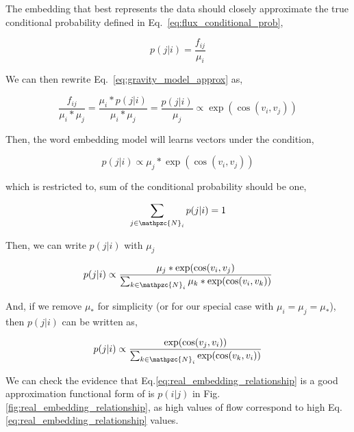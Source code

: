 \documentclass[12pt]{article} %
\begin{document}
The embedding that best represents the data should closely approximate the true conditional probability defined in
Eq.~\ref{eq:flux_conditional_prob},

\begin{equation}
    \label{eq:flux_conditional_prob}
    p(j|i) = \frac{f_{ij}}{\mu_i} 
\end{equation}

We can then rewrite Eq.~\ref{eq:gravity_model_approx} as, 

\begin{equation}
    \label{eq:gravity_relationship}
    \frac{f_{ij}}{\mu_i * \mu_j} = \frac{\mu_i * p(j|i)}{\mu_i * \mu_j} =  \frac{p(j|i)}{\mu_j} \propto \exp(\cos(v_i,v_j))
\end{equation}

Then, the word embedding model will learns vectors under the condition,

\begin{equation}
    \label{eq:conditional probability}
      p(j|i) \propto {\mu_j}* \exp(\cos(v_i,v_j))
\end{equation}

which is restricted to, sum of the conditional probability should be one,

\begin{equation}
    \label{eq:sum of the conditional probabiitliy}
    \sum_{j\in\mathpzc{N}_i} p(j|i) = 1
\end{equation}

Then, we can write $p(j|i)$ with $\mu_{j}$

\begin{equation}
    p(j|i) \propto \frac{{\mu_j}* \exp(\cos(v_i,v_j)}{\sum_{k\in\mathpzc{N}_i} {\mu_k}* \exp(\cos(v_i,v_k))}
\end{equation}

And, if we remove ${\mu_*}$ for simplicity (or for our special case with $\mu_{i} = \mu_{j} = \mu_*$), then $p(j|i)$ can be written as,

\begin{equation}
    \label{eq:real_embedding_relationship}
    p(j|i) \propto \frac{\exp(\cos(v_j, v_i))}{\sum_{k\in\mathpzc{N}_i} \exp(\cos(v_k,v_i))}
\end{equation}

We can check the evidence that Eq.\ref{eq:real_embedding_relationship} is a good approximation functional form of is $p(i|j)$ in Fig. \ref{fig:real_embedding_relationship}, as high values of flow correspond to high Eq.\ref{eq:real_embedding_relationship} values.
\end{document}
